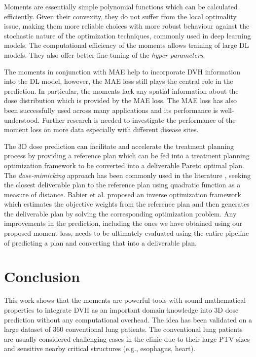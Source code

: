 \documentclass[10pt]{article}
\begin{document}
Moments are essentially simple polynomial functions which can be calculated efficiently. Given their convexity, they do not suffer from the local optimality issue, making them  more reliable choices with more robust behaviour against the stochastic nature of the optimization techniques, commonly used in deep learning models. The computational efficiency of the moments allows training of large DL models. They also offer better fine-tuning of the \textit{hyper parameters}.  

The moments in conjunction with MAE help to incorporate DVH information into the DL model, however, the MAE loss still plays the central role in the prediction. In particular, the moments lack any spatial information about the dose distribution which is provided by the MAE loss. The MAE loss has also been successfully used across many applications and its performance is  well-understood. Further research is needed to investigate the performance of the moment loss on more data especially with different disease sites.  

The 3D dose prediction can facilitate and accelerate the treatment planning process by providing a reference plan which can be fed into a treatment planning optimization framework to be converted into a deliverable Pareto optimal plan. The \textit{dose-mimicking} approach has been commonly used in the literature \cite{fan2019automatic}, seeking the closest deliverable plan to the reference plan using quadratic function as a measure of distance. Babier et al. \cite{babier2020importance} proposed an inverse optimization framework which estimates the objective weights from the reference plan and then generates the deliverable plan by solving the corresponding optimization problem. Any improvements in the prediction, including the ones we have obtained using our proposed moment loss, needs to be ultimately evaluated using the entire pipeline of predicting a plan and converting that into a deliverable plan. 

\section{Conclusion}
This work shows that the moments are powerful tools with sound mathematical properties to integrate DVH as an important domain knowledge into 3D dose prediction without any computational overhead. The idea has been validated on a large dataset of 360  conventional lung patients. The conventional lung patients are usually considered challenging cases in the clinic due to their large PTV sizes and sensitive nearby critical structures (e.g., esophagus, heart).
\end{document}
